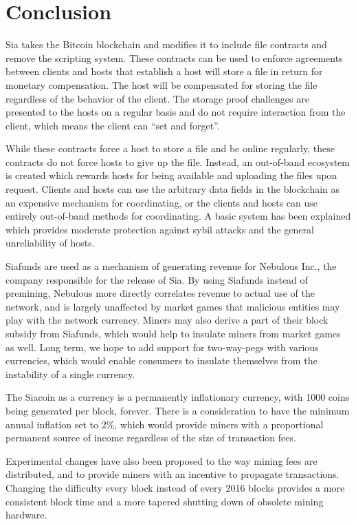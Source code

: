 \documentclass[twocolumn]{article}
\begin{document}
\section{Conclusion}
Sia takes the Bitcoin blockchain and modifies it to include file contracts and remove the scripting system.
These contracts can be used to enforce agreements between clients and hosts that establish a host will store a file in return for monetary compensation.
The host will be compensated for storing the file regardless of the behavior of the client.
The storage proof challenges are presented to the hosts on a regular basis and do not require interaction from the client, which means the client can ``set and forget''.

While these contracts force a host to store a file and be online regularly, these contracts do not force hosts to give up the file.
Instead, an out-of-band ecosystem is created which rewards hosts for being available and uploading the files upon request.
Clients and hosts can use the arbitrary data fields in the blockchain as an expensive mechanism for coordinating, or the clients and hosts can use entirely out-of-band methods for coordinating.
A basic system has been explained which provides moderate protection against sybil attacks and the general unreliability of hosts.

Siafunds are used as a mechanism of generating revenue for Nebulous Inc., the company responsible for the release of Sia.
By using Siafunds instead of premining, Nebulous more directly correlates revenue to actual use of the network, and is largely unaffected by market games that malicious entities may play with the network currency.
Miners may also derive a part of their block subsidy from Siafunds, which would help to insulate miners from market games as well.
Long term, we hope to add support for two-way-pegs with various currencies, which would enable consumers to insulate themselves from the instability of a single currency.

The Siacoin as a currency is a permanently inflationary currency, with 1000 coins being generated per block, forever.
There is a consideration to have the minimum annual inflation set to 2\%, which would provide miners with a proportional permanent source of income regardless of the size of transaction fees.

Experimental changes have also been proposed to the way mining fees are distributed, and to provide miners with an incentive to propagate transactions.
Changing the difficulty every block instead of every 2016 blocks provides a more consistent block time and a more tapered shutting down of obsolete mining hardware.
\end{document}
